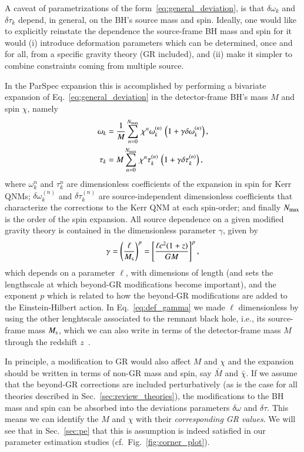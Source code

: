 \documentclass[twocolumn,
               prd,
               aps,
               superscriptaddress,
               tightenlines,
               nofootinbib,
               eqsecnum,
               amsfonts,
               amsmath,
               longbibliography]{revtex4-1}
\begin{document}
A caveat of parametrizations of the form~\eqref{eq:general_deviation}, is that
$\delta\omega_{k}$ and $\delta\tau_{k}$ depend, in general, on the BH's source mass and spin.
%
Ideally, one would like to explicitly reinstate the dependence the source-frame
BH mass and spin for it would
%
(i) introduce deformation parameters which can be determined, once and for
all, from a specific gravity theory (GR included), and
%
(ii) make it simpler to combine constraints coming from multiple source.

In the ParSpec expansion this is accomplished by performing a bivariate
expansion of Eq.~\eqref{eq:general_deviation} in the detector-frame BH's mass
$M$ and spin $\chi$, namely
%
\begin{subequations}
\label{eq:kerr_expansion}
\begin{align}
\omega_{k} &= \frac{1}{M} \sum_{n = 0}^{N_{\rm max}} \, \chi^{n} \omega^{(n)}_{k} \, \left( 1 + \gamma \delta \omega^{(n)}_{k} \right), \\
\tau_{k}   &= M     \sum_{n = 0}^{N_{\rm max}} \, \chi^{n} \tau^{(n)}_{k}   \, \left( 1 + \gamma \delta \tau^{(n)}_{k} \right),
\end{align}
\end{subequations}
%
where $\omega_{k}^{n}$ and $\tau_{k}^{n}$ are dimensionless coefficients of the
expansion in spin for Kerr QNMs;
%
$\delta\omega_{k}^{(n)}$ and $\delta\tau_{k}^{(n)}$ are source-independent
dimensionless coefficients that characterize the corrections to the Kerr QNM at
each spin-order;
%
and finally $N_{\rm max}$ is the order of the spin expansion.
%
All source dependence on a given modified gravity theory is contained in the
dimensionless parameter $\gamma$, given by
%
\begin{equation}
\gamma
%
= \left(\frac{\ell}{M_{\rm s}}\right)^{p}
%
= \left[
\frac{\ell c^2 (1 + z)}{G M}
\right]^{p},
\label{eq:def_gamma}
\end{equation}
%
which depends on a parameter $\ell$, with dimensions of length (and sets the
lengthscale at which beyond-GR modifications become important), and
the exponent $p$ which is related to how the beyond-GR modifications are
added to the Einstein-Hilbert action.
%
In Eq.~\eqref{eq:def_gamma} we made $\ell$ dimensionless by using the other
lenghtscale associated to the remnant black hole, i.e., its source-frame mass
$M_{\rm s}$, which we can also write in terms of the detector-frame mass $M$ through
the redshift $z$~\cite{Krolak:1987ofj}.

In principle, a modification to GR would also affect $M$ and $\chi$ and the
expansion should be written in terms of non-GR mass and spin, say $\bar{M}$ and
$\bar{\chi}$. If we assume that the beyond-GR corrections are included perturbatively
(as is the case for all theories described in Sec.~\ref{sec:review_theories}),
the modifications to the BH mass and spin can be absorbed into the deviations
parameters $\delta\omega$ and $\delta\tau$.
%
This means we can identify the $M$ and $\chi$ with their \emph{corresponding GR values}.
%
We will see that in Sec.~\ref{sec:pe} that this is assumption is indeed
satisfied in our parameter estimation studies (cf.~Fig.~\ref{fig:corner_plot}).
\end{document}
